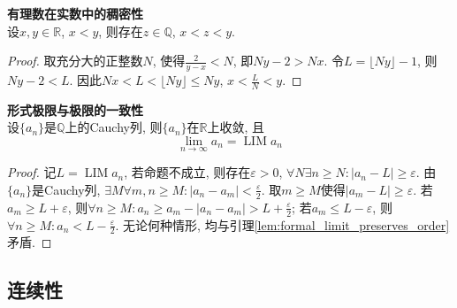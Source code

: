\begin{pro} \textbf{有理数在实数中的稠密性} \\
设$x,y\in \mathbb{R}$, $x<y$, 则存在$z\in\mathbb{Q}$, $x<z<y$. 
\end{pro}
\begin{proof}
取充分大的正整数$N$, 使得$\frac{2}{y-x}<N$, 即$Ny-2>Nx$. 令$L = \lfloor Ny \rfloor-1$, 则$Ny-2<L$. 因此$Nx<L<\lfloor Ny \rfloor\le Ny$, $x<\frac{L}{N}<y$. 
\end{proof}

\begin{pro} \textbf{形式极限与极限的一致性} \\
设$\{a_n\}$是$\mathbb{Q}$上的Cauchy列, 则$\{a_n\}$在$\mathbb{R}$上收敛, 且
\begin{equation}
    \lim\limits_{n\to\infty} a_n = \operatorname{LIM} a_n
\end{equation}
\end{pro}
\begin{proof}
记$L=\operatorname{LIM} a_n$, 若命题不成立, 则存在$\varepsilon>0$, $\forall N \exists n\ge N: |a_n-L|\ge \varepsilon$. 由$\{a_n\}$是Cauchy列, $\exists M \forall m,n \ge M: |a_n-a_m|< \frac{\varepsilon}{2}$. 取$m\ge M$使得$|a_m-L|\ge \varepsilon$. 若$a_m\ge L+\varepsilon$, 则$\forall n\ge M: a_n \ge a_m - |a_n-a_m| > L + \frac{\varepsilon}{2}$; 若$a_m\le L-\varepsilon$, 则$\forall n\ge M: a_n < L - \frac{\varepsilon}{2}$. 无论何种情形, 均与引理\ref{lem:formal_limit_preserves_order}矛盾. 
\end{proof}

\subsection{连续性}

